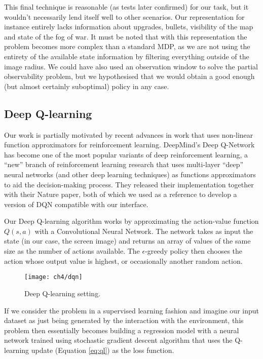 This final technique is reasonable (as tests later confirmed) for our task, but
it wouldn't necessarily lend itself well to other scenarios. Our representation
for instance entirely lacks information about upgrades, bullets, visibility of
the map and state of the fog of war. It must be noted that with this
representation the problem becomes more complex than a standard MDP, as we are
not using the entirety of the available state information by filtering
everything outside of the image radius. We could have also used an observation
window to solve the partial observability problem, but we hypothesised that we
would obtain a good enough (but almost certainly suboptimal) policy in any case.


\subsection{Deep Q-learning}

Our work is partially motivated by recent advances in work that uses non-linear
function approximators for reinforcement learning. DeepMind's Deep Q-Network has
become one of the most popular variants of deep reinforcement learning, a
``new'' branch of reinforcement learning research that uses multi-layer ``deep''
neural networks (and other deep learning techniques) as functions approximators
to aid the decision-making process. They released their implementation together
with their Nature paper, both of which we used as a reference to develop a
version of DQN compatible with our interface.

Our Deep Q-learning algorithm works by approximating the action-value function
$Q(s, a)$ with a Convolutional Neural Network. The network takes as input the
state (in our case, the screen image) and returns an array of values of the same
size as the number of actions available. The $\epsilon$-greedy policy then
chooses the action whose output value is highest, or occasionally another random
action.

\begin{figure}[h]
    \centering
    \texttt{[image: ch4/dqn]}
    \caption{Deep Q-learning setting.}
    \label{fig:dqn}
\end{figure}

If we consider the problem in a supervised learning fashion and imagine our
input dataset as just being generated by the interaction with the environment,
this problem then essentially becomes building a regression model with a neural
network trained using stochastic gradient descent algorithm that uses the
Q-learning update (Equation \ref{eq:ql}) as the loss function.

